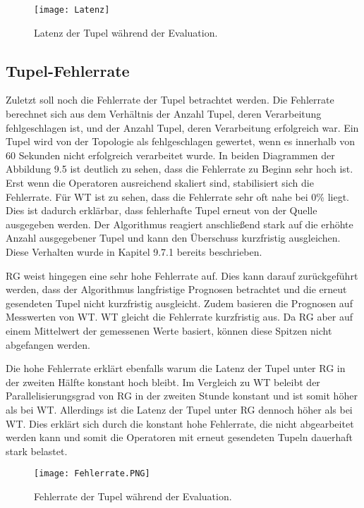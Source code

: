 \begin{figure}
\texttt{[image: Latenz]}
\caption{Latenz der Tupel während der Evaluation.}
\end{figure}

\subsection{Tupel-Fehlerrate}

Zuletzt soll noch die Fehlerrate der Tupel betrachtet werden.
Die Fehlerrate berechnet sich aus dem Verhältnis der Anzahl Tupel, deren Verarbeitung fehlgeschlagen ist, und der Anzahl Tupel, deren Verarbeitung erfolgreich war.
Ein Tupel wird von der Topologie als fehlgeschlagen gewertet, wenn es innerhalb von 60 Sekunden nicht erfolgreich verarbeitet wurde.
In beiden Diagrammen der Abbildung 9.5 ist deutlich zu sehen, dass die Fehlerrate zu Beginn sehr hoch ist.
Erst wenn die Operatoren ausreichend skaliert sind, stabilisiert sich die Fehlerrate.
Für WT ist zu sehen, dass die Fehlerrate sehr oft nahe bei 0\% liegt.
Dies ist dadurch erklärbar, dass fehlerhafte Tupel erneut von der Quelle ausgegeben werden.
Der Algorithmus reagiert anschließend stark auf die erhöhte Anzahl ausgegebener Tupel und kann den Überschuss kurzfristig ausgleichen.
Diese Verhalten wurde in Kapitel 9.7.1 bereits beschrieben.

RG weist hingegen eine sehr hohe Fehlerrate auf.
Dies kann darauf zurückgeführt werden, dass der Algorithmus langfristige Prognosen betrachtet und die erneut gesendeten Tupel nicht kurzfristig ausgleicht.
Zudem basieren die Prognosen auf Messwerten von WT.
WT gleicht die Fehlerrate kurzfristig aus.
Da RG aber auf einem Mittelwert der gemessenen Werte basiert, können diese Spitzen nicht abgefangen werden.

Die hohe Fehlerrate erklärt ebenfalls warum die Latenz der Tupel unter RG in der zweiten Hälfte konstant hoch bleibt.
Im Vergleich zu WT beleibt der Parallelisierungsgrad von RG in der zweiten Stunde konstant und ist somit höher als bei WT.
Allerdings ist die Latenz der Tupel unter RG dennoch höher als bei WT.
Dies erklärt sich durch die konstant hohe Fehlerrate, die nicht abgearbeitet werden kann und somit die Operatoren mit erneut gesendeten Tupeln dauerhaft stark belastet.

\begin{figure}
\texttt{[image: Fehlerrate.PNG]}
\caption{Fehlerrate der Tupel während der Evaluation.}
\end{figure}

